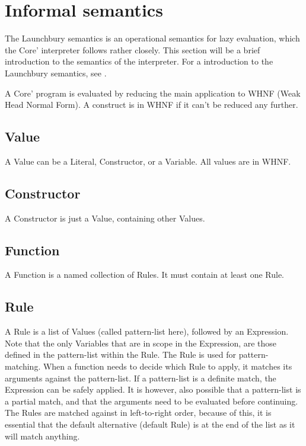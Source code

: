 \section{Informal semantics}

The Launchbury semantics is an operational semantics for 
lazy evaluation, which the Core' interpreter follows rather closely. 
This section will be a brief introduction to the semantics of the interpreter.
For a introduction to 
the Launchbury semantics, see \cite{launchbury1993natural}. 

A Core' program is evaluated by reducing the main application to WHNF 
(Weak Head Normal Form). A construct is in WHNF if it can't be
reduced any further.

\subsection*{Value}
A Value can be a Literal, Constructor, or a Variable. All values are in WHNF.

\subsection*{Constructor}
A Constructor is just a Value, containing other Values.

\subsection*{Function}
A Function is a named collection of Rules. It must contain at least one Rule.

\subsection*{Rule}
A Rule is a list of Values (called pattern-list here), followed by an Expression. 
Note that the only Variables
that are in scope in the Expression, are those defined in the pattern-list within 
the Rule. The Rule is used for pattern-matching. When a function needs to decide
which Rule to apply, it matches its arguments against the pattern-list. 
If a pattern-list is a definite match, the Expression can be safely
applied. It is however, also possible that a pattern-list is a partial match, and
that the arguments need to be evaluated before continuing. The Rules are matched
against in left-to-right order, because of this, it is essential that the 
default alternative (default Rule) is at the end of the list as it will match
anything.

